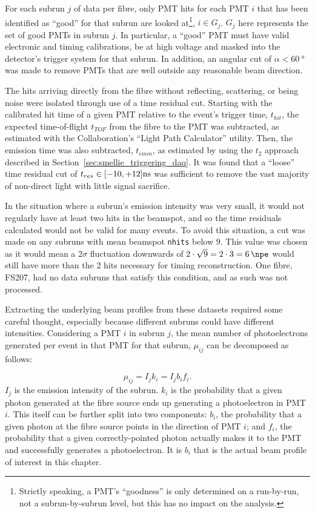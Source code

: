 For each subrun $j$ of data per fibre, only PMT hits for each PMT $i$ that has been identified as ``good'' for that subrun are looked at\footnote{Strictly speaking, a PMT's ``goodness'' is only determined on a run-by-run, not a subrun-by-subrun level, but this has no impact on the analysis.}, $i \in G_{j}$. $G_{j}$ here represents the set of good PMTs in subrun $j$. In particular, a ``good'' PMT must have valid electronic and timing calibrations, be at high voltage and masked into the detector's trigger system for that subrun. In addition, an angular cut of $\alpha < \SI{60}{\degree}$ was made to remove PMTs that are well outside any reasonable beam direction. 

The hits arriving directly from the fibre without reflecting, scattering, or being noise were isolated through use of a time residual cut. Starting with the calibrated hit time of a given PMT relative to the event's trigger time, $t_{hit}$, the expected time-of-flight $t_{TOF}$ from the fibre to the PMT was subtracted, as estimated with the Collaboration's ``Light Path Calculator'' utility. Then, the emission time was also subtracted, $t_{emm}$, as estimated by using the $t_{2}$ approach described in Section~\ref{sec:smellie_triggering_daq}. It was found that a ``loose'' time residual cut of $t_{res} \in [-10, +12] \si[]{\nano\second}$ was sufficient to remove the vast majority of non-direct light with little signal sacrifice. 

In the situation where a subrun's emission intensity was very small, it would not regularly have at least two hits in the beamspot, and so the time residuals calculated would not be valid for many events. To avoid this situation, a cut was made on any subruns with mean beamspot \texttt{nhits} below 9. This value was chosen as it would mean a $2\sigma$ fluctuation downwards of $2\cdot\sqrt{9}=2\cdot3=\SI{6}{\npe}$ would still have more than the 2 hits necessary for timing reconstruction. One fibre, FS207, had no data subruns that satisfy this condition, and as such was not processed.

Extracting the underlying beam profiles from these datasets required some careful thought, especially because different subruns could have different intensities. Considering a PMT $i$ in subrun $j$, the mean number of photoelectrons generated per event in that PMT for that subrun, $\mu_{ij}$ can be decomposed as follows:

\begin{equation}\label{eq:mu_def}
    \mu_{ij} = I_{j}k_{i} = I_{j}b_{i}f_{i}.
\end{equation}
$I_{j}$ is the emission intensity of the subrun. $k_{i}$ is the probability that a given photon generated at the fibre source ends up generating a photoelectron in PMT $i$. This itself can be further split into two components: $b_{i}$, the probability that a given photon at the fibre source points in the direction of PMT $i$; and $f_{i}$, the probability that a given correctly-pointed photon actually makes it to the PMT and successfully generates a photoelectron. It is $b_{i}$ that is the actual beam profile of interest in this chapter.

